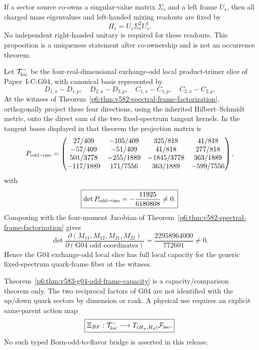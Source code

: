 \documentclass[12pt,a4paper]{article}
\begin{document}
\begin{proposition}
\label{p6:prop:v583-positive-return-target}
If a sector source co-owns a singular-value matrix $\Sigma_s$ and a left frame
$U_s$, then all charged mass eigenvalues and left-handed mixing readouts are
fixed by
\[
 \boxed{H_s=U_s\Sigma_s^2U_s^\dagger.}
\]
No independent right-handed unitary is required for these readouts.  This
proposition is a uniqueness statement after co-ownership and is not an
occurrence theorem.
\end{proposition}

\begin{theorem}
\label{p6:thm:v583-g04-odd-frame-capacity}
Let $\mathcal T_{\rm loc}^{-}$ be the four-real-dimensional exchange-odd local
product-trimer slice of Paper~I-C-G04, with canonical basis represented by
\[
 D_{1,x}-D_{1,p},\quad D_{2,x}-D_{2,p},\quad
 C_{1,x}-C_{1,p},\quad C_{2,x}-C_{2,p}.
\]
At the witness of Theorem~\ref{p6:thm:v582-spectral-frame-factorization},
orthogonally project these four directions, using the inherited
Hilbert--Schmidt metric, onto the direct sum of the two fixed-spectrum tangent
kernels.  In the tangent bases displayed in that theorem the projection matrix
is
\[
 P_{\rm odd\to iso}=\begin{pmatrix}
 27/409&-105/409&325/818&41/818\\
 -57/409&-51/409&41/818&277/818\\
 501/3778&-255/1889&-1845/3778&363/1889\\
 -117/1889&171/7556&363/1889&-599/7556
 \end{pmatrix},
\]
with
\[
 \boxed{\det P_{\rm odd\to iso}=-\frac{11925}{6180808}\ne0.}
\]
Composing with the four-moment Jacobian of
Theorem~\ref{p6:thm:v582-spectral-frame-factorization} gives
\[
 \boxed{
 \det\frac{\partial(M_{11},M_{12},M_{21},M_{22})}
 {\partial(\text{G04 odd coordinates})}
 =\frac{22958964000}{772601}\ne0.}
\]
Hence the G04 exchange-odd local slice has full local capacity for the
generic fixed-spectrum quark-frame fiber at the witness.
\end{theorem}

\begin{remark}
\label{p6:rem:v583-bornodd-flavor-firewall}
Theorem~\ref{p6:thm:v583-g04-odd-frame-capacity} is a capacity/comparison
theorem only.  The two reciprocal factors of G04 are not identified with the
up/down quark sectors by dimension or rank.  A physical use requires an
explicit same-parent action map
\[
 \boxed{\Xi_{BF}:\mathcal T_{\rm loc}^{-}
 \longrightarrow T_{(H_u,H_d)}\mathcal F_{\rm iso}.}
\]
No such typed Born-odd-to-flavor bridge is asserted in this release.
\end{remark}
\end{document}
